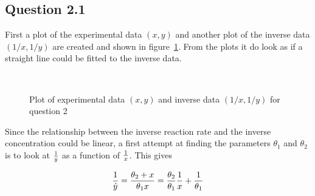 \subsection*{Question 2.1}


First a plot of the experimental data $(x,y)$ and another plot of the inverse data $(1/x, 1/y)$ are created and shown in figure~\ref{fig:ex2-plot-data}. From the plots it do look as if a straight line could be fitted to the inverse data.

\begin{figure}[!ht]
    \centering
    \mbox{ \quad 
          }
    \caption{Plot of experimental data $(x,y)$ and inverse data $(1/x, 1/y)$ for question 2}
    \label{fig:ex2-plot-data}
\end{figure}

Since the relationship between the inverse reaction rate and the inverse concentration could be linear, a first attempt at finding the parameters $\theta_1$ and $\theta_2$ is to look at $\frac{1}{\hat{y}}$ as a function of $\frac{1}{x}$. This gives

\begin{equation*}
    \frac{1}{\hat{y}} = \frac{\theta_2 + x}{\theta_1x} = \frac{\theta_2}{\theta_1}\frac{1}{x} + \frac{1}{\theta_1}
\end{equation*}

